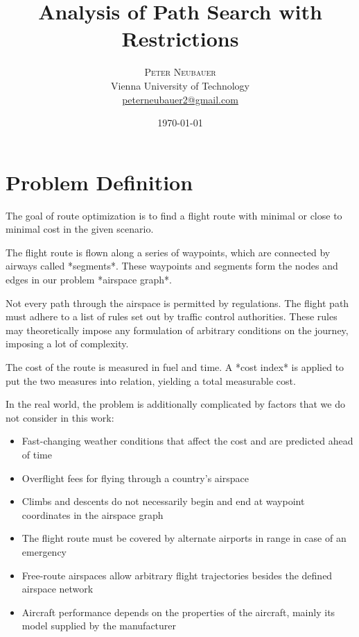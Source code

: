 \documentclass{article}
\title{Analysis of Path Search with Restrictions} %
\author{%
\textsc{Peter Neubauer} \\[1ex] %
\normalsize Vienna University of Technology \\ %
\normalsize \href{mailto:peterneubauer2@gmail.com}{peterneubauer2@gmail.com} %
}
\date{\today} %
\begin{document}
\maketitle


\section{Problem Definition}
The goal of route optimization is to find a flight route with minimal or close to minimal cost in the given scenario.

The flight route is flown along a series of waypoints, which are connected by airways called *segments*. These waypoints and segments form the nodes and edges in our problem *airspace graph*.

Not every path through the airspace is permitted by regulations. The flight path must adhere to a list of rules set out by traffic control authorities. These rules may theoretically impose any formulation of arbitrary conditions on the journey, imposing a lot of complexity.

The cost of the route is measured in fuel and time. A *cost index* is applied to put the two measures into relation, yielding a total measurable cost.

In the real world, the problem is additionally complicated by factors that we do not consider in this work:

\begin{itemize}

\item Fast-changing weather conditions that affect the cost and are predicted ahead of time

\item{Overflight fees for flying through a country's airspace}

\item Climbs and descents do not necessarily begin and end at waypoint coordinates in the airspace graph

\item The flight route must be covered by alternate airports in range in case of an emergency

\item Free-route airspaces allow arbitrary flight trajectories besides the defined airspace network

\item Aircraft performance depends on the properties of the aircraft, mainly its model supplied by the manufacturer

\end{itemize}
\end{document}
